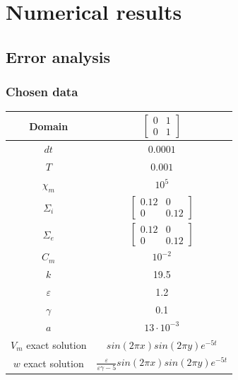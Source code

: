 \documentclass[8pt]{beamer}
\begin{document}
\section{Numerical results}
\subsection{Error analysis}

\begin{frame}
\frametitle{Chosen data}
\begin{center}
	\begin{tabular}{|c|c|} 
		\hline 
		Domain & $\begin{bmatrix} 0 & 1 \\ 0 & 1 \end{bmatrix}$ \\
		\hline 
		$dt$ & $0.0001$ \\
		\hline
		$T$ & $0.001$ \\
		\hline
		$\chi_m$ & $10^5$ \\
		\hline
		$\Sigma_i$ & $\begin{bmatrix} 0.12 & 0 \\ 0 & 0.12 \end{bmatrix}$ \\
		\hline
		$\Sigma_e$ & $\begin{bmatrix} 0.12 & 0 \\ 0 & 0.12 \end{bmatrix}$ \\
		\hline
		$C_m$ & $10^{-2}$ \\
		\hline
		$k$ & 19.5 \\ 
		\hline
		$\varepsilon$ & 1.2 \\
		\hline
		$\gamma$ & 0.1 \\
		\hline
		$a$ & $13 \cdot 10^{-3}$ \\
		\hline
		$V_m$ exact solution & $sin(2 \pi x) sin(2 \pi y) e^{-5 t}$ \\
		\hline
		$w$ exact solution & $\frac{\varepsilon}{\varepsilon \gamma-5} sin(2 \pi x) sin(2 \pi y) e^{-5 t}$ \\
		\hline
		
	\end{tabular}
\end{center}
\end{frame}
\end{document}
